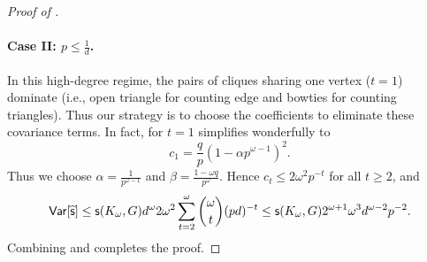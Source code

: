\begin{proof}[Proof of ]
\paragraph{Case II: $p \leq \frac{1}{d}$.}
In this high-degree regime, the pairs of cliques sharing one vertex ($t=1$) dominate (i.e., open triangle for counting edge and bowties for counting triangles). Thus our strategy is to choose the coefficients to eliminate these covariance terms. In fact,  for $t=1$ simplifies wonderfully to
\[
c_1 = \frac{q}{p}(1-\alpha p^{\omega-1})^2.
\]
Thus we choose $\alpha =  \frac{1}{ p^{\omega-1}}$ and $\beta = \frac{1-\omega q}{p^{\omega}}$. Hence $c_t \leq 2 \omega^2 p^{-t}$ for all $t \geq 2$, and
\begin{equation}
\mathsf{Var}[\widehat{\mathsf{s}}] \leq \mathsf{s}(K_\omega,G) d^\omega 2 \omega^2 \sum_{t=2}^{\omega} \binom{\omega}{t}  (pd)^{-t} 
\leq \mathsf{s}(K_\omega,G)  2^{\omega+1} \omega^3 d^{\omega-2} p^{-2}.
\label{eq:cliquevar2}
\end{equation}
Combining  and  completes the proof.
\end{proof}

